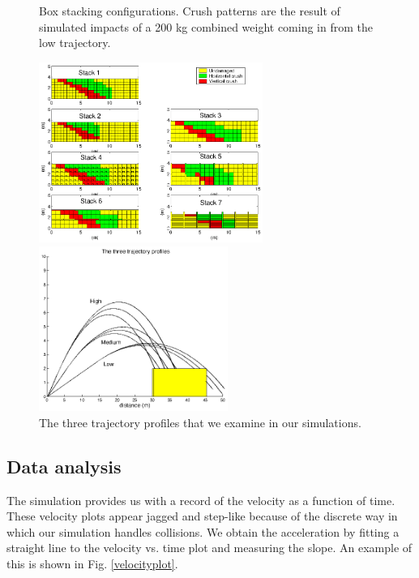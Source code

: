\documentclass[12pt,a4paper,titlepage]{article}
\begin{document}
\begin{figure}
\begin{center}
\caption{\label{stackfig} Box stacking configurations.  Crush patterns are the result of simulated impacts
of a 200 kg combined weight coming in from the low trajectory.}
\includegraphics[width=0.65\textwidth]{stacktypes.eps}
\end{center}

\caption{\label{trajectories} The three trajectory profiles that we examine in our simulations.}
\begin{center}
\includegraphics[width=0.55\textwidth]{trajectories.eps}
\end{center}
\end{figure}

\subsection{Data analysis}

The simulation provides us with a record of the velocity as a function of time.  These velocity plots appear jagged
and step-like because of the discrete way in which our simulation handles collisions.  We obtain the acceleration by
fitting a straight line to the velocity vs. time plot and measuring the slope.  An example of this is shown in
Fig. \ref{velocityplot}.
\end{document}

